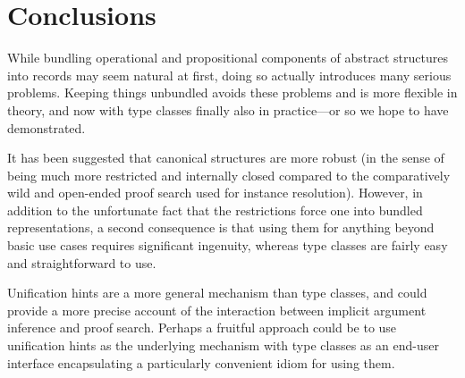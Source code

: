 \documentclass[a4paper,10pt,runningheads]{llncs}
\begin{document}
\section{Conclusions}
\label{conclusion}

While bundling operational and propositional components of abstract structures into records may seem natural at first, doing so actually introduces many serious problems. Keeping things unbundled avoids these problems and is more flexible in theory, and now with type classes finally also in practice---or so we hope to have demonstrated.


It has been suggested that canonical structures are more robust (in the sense of being much more restricted and internally closed compared to the comparatively wild and open-ended proof search used for instance resolution). However, in addition to the unfortunate fact that the restrictions force one into bundled representations, a second consequence is that using them for anything beyond basic use cases requires significant ingenuity, whereas type classes are fairly easy and straightforward to use.


Unification hints are a more general mechanism than type classes, and could provide a more precise account of the interaction between implicit argument inference and proof search. Perhaps a fruitful approach could be to use unification hints as the underlying mechanism with type classes as an end-user interface encapsulating a particularly convenient idiom for using them.
\end{document}
